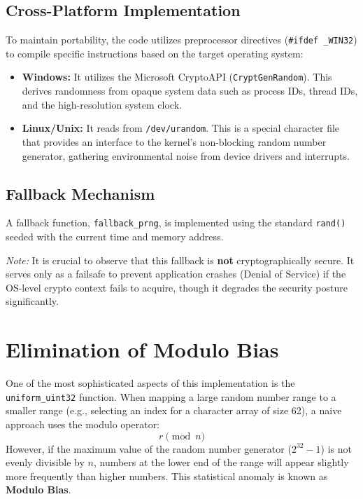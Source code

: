 \documentclass[conference]{IEEEtran}
\begin{document}
\subsection{Cross-Platform Implementation}
To maintain portability, the code utilizes preprocessor directives (\texttt{\#ifdef \_WIN32}) to compile specific instructions based on the target operating system:

\begin{itemize}
    \item \textbf{Windows:} It utilizes the Microsoft CryptoAPI (\texttt{CryptGenRandom}). This derives randomness from opaque system data such as process IDs, thread IDs, and the high-resolution system clock.
    \item \textbf{Linux/Unix:} It reads from \texttt{/dev/urandom}. This is a special character file that provides an interface to the kernel's non-blocking random number generator, gathering environmental noise from device drivers and interrupts.
\end{itemize}

\subsection{Fallback Mechanism}
A fallback function, \texttt{fallback\_prng}, is implemented using the standard \texttt{rand()} seeded with the current time and memory address.

\textit{Note:} It is crucial to observe that this fallback is \textbf{not} cryptographically secure. It serves only as a failsafe to prevent application crashes (Denial of Service) if the OS-level crypto context fails to acquire, though it degrades the security posture significantly.

\section{Elimination of Modulo Bias}
One of the most sophisticated aspects of this implementation is the \texttt{uniform\_uint32} function. When mapping a large random number range to a smaller range (e.g., selecting an index for a character array of size 62), a naive approach uses the modulo operator:
\begin{equation}
    r \pmod n
\end{equation}
However, if the maximum value of the random number generator ($2^{32}-1$) is not evenly divisible by $n$, numbers at the lower end of the range will appear slightly more frequently than higher numbers. This statistical anomaly is known as \textbf{Modulo Bias}.
\end{document}

